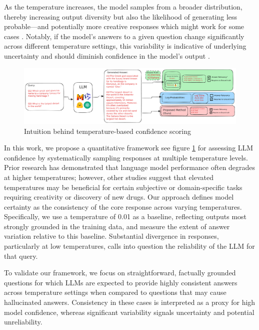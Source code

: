 \documentclass[sigconf]{acmart}
\begin{document}
As the temperature increases, the model samples from a broader distribution, thereby increasing output diversity but also the likelihood of generating less probable—and potentially more creative responses which might work for some cases \cite{hallucinations_drug,temperature_effect}. Notably, if the model's answers to a given question change significantly across different temperature settings, this variability is indicative of underlying uncertainty and should diminish confidence in the model's output \cite{detecting_hallucinations}.

\begin{figure}[t]
    \centering
    \includegraphics[width=\textwidth]{images/Figure_teaser.pdf}
    \caption{Intuition behind temperature-based confidence scoring}
    \label{fig:intuition}
\end{figure}


In this work, we propose a quantitative framework see figure \ref{fig:intuition} for assessing LLM confidence by systematically sampling responses at multiple temperature levels. Prior research has demonstrated that language model performance often degrades at higher temperatures; however, other studies suggest that elevated temperatures may be beneficial for certain subjective or domain-specific tasks \cite{hallucinations_drug,temperature_effect,detecting_hallucinations} requiring creativity or discovery of new drugs. Our approach defines model certainty as the consistency of the core response across varying temperatures. Specifically, we use a temperature of 0.01 as a baseline, reflecting outputs most strongly grounded in the training data, and measure the extent of answer variation relative to this baseline. Substantial divergence in responses, particularly at low temperatures, calls into question the reliability of the LLM for that query.

To validate our framework, we focus on straightforward, factually grounded questions for which LLMs are expected to provide highly consistent answers across temperature settings when compared to questions that may cause hallucinated answers.
Consistency in these cases is interpreted as a proxy for high model confidence, whereas significant variability signals uncertainty and potential unreliability.
\end{document}
